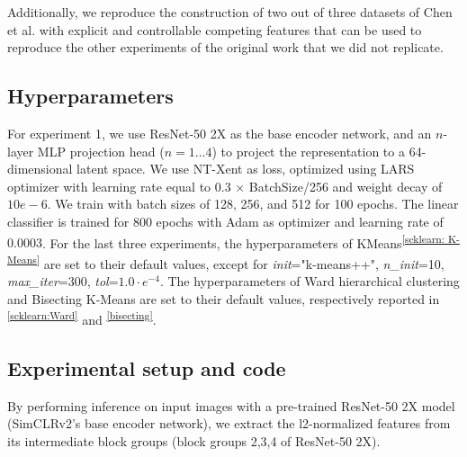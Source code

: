     Additionally, we reproduce the construction of two out of three datasets of Chen et al. \cite{chen2021intriguing} with explicit and controllable competing features that can be used to reproduce the other experiments of the original work that we did not replicate.

    \subsection{Hyperparameters}

    
    For experiment 1, we use ResNet-50 2X as the base encoder network, and an $n$-layer MLP projection head ($n=1\dots4$) to project the representation to a 64-dimensional latent space. We use NT-Xent as loss, optimized using LARS optimizer \cite{you2017large} with learning rate equal to 0.3 × BatchSize/256 and weight decay of $10e−6$. We train with batch sizes of 128, 256, and 512 for 100 epochs. The linear classifier is trained for 800 epochs with Adam \cite{kingma2014adam} as optimizer and learning rate of $0.0003$. For the last three experiments, the hyperparameters of KMeans\textsuperscript{\ref{scklearn: K-Means}} are set to their default values, except for \textit{init}="k-means++", \textit{n\_init}=10, \textit{max\_iter}=300, \textit{tol}=$1.0 \cdot e^{-4}$. The hyperparameters of Ward hierarchical clustering and Bisecting K-Means are set to their default values, respectively reported in \textsuperscript{\ref{scklearn:Ward}} and \textsuperscript{\ref{bisecting}}.
    
    \subsection{Experimental setup and code}


    By performing inference on input images with a pre-trained ResNet-50 2X model (SimCLRv2's base encoder network), we extract the l2-normalized features from its intermediate block groups (block groups 2,3,4 of ResNet-50 2X).
    
